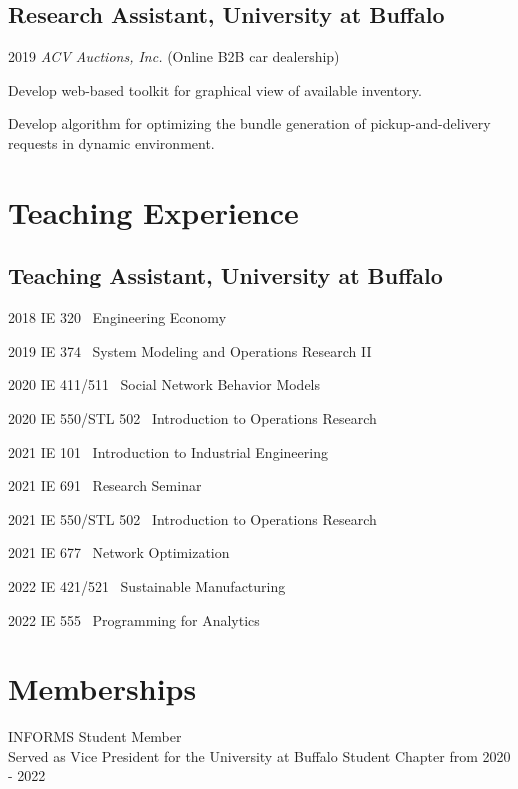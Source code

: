 \documentclass[12pt,letterpaper]{report}
\newcommand{\listitemspace}{0.25em}
\renewenvironment{itemize}
{\begin{list}{}{\setlength{\leftmargin}{0em}
                \setlength{\parskip}{0em}
                \setlength{\itemsep}{\listitemspace}
                \setlength{\parsep}{\listitemspace}}}
{\end{list}}
\begin{document}
    \subsection*{Research Assistant, University at Buffalo}
    \begin{tablist}
        \item[2019] \tab{} \textit{ACV Auctions, Inc.} (Online B2B car dealership)\\
        \item[] \tab{} Develop web-based toolkit for graphical view of available inventory. 
        \item[] \tab{} Develop algorithm for optimizing the bundle generation of pickup-and-delivery requests in dynamic environment.
    \end{tablist}

    \section*{Teaching Experience}
    \subsection*{Teaching Assistant, University at Buffalo}
    \begin{tablist}
        \item[2018] \tab{} IE 320 \ Engineering Economy
        \item[2019] \tab{} IE 374 \ System Modeling and Operations Research II
        \item[2020] \tab{} IE 411/511 \ Social Network Behavior Models
        \item[2020] \tab{} IE 550/STL 502 \ Introduction to Operations Research
        \item[2021] \tab{} IE 101 \ Introduction to Industrial Engineering
        \item[2021] \tab{} IE 691 \ Research Seminar
        \item[2021] \tab{} IE 550/STL 502 \ Introduction to Operations Research
        \item[2021] \tab{} IE 677 \ Network Optimization
        \item[2022] \tab{} IE 421/521 \ Sustainable Manufacturing
        \item[2022] \tab{} IE 555 \ Programming for Analytics
    \end{tablist}

    \section*{Memberships}
    \begin{itemize}
        \item INFORMS Student Member\\
        \quad Served as Vice President for the University at Buffalo Student Chapter from 2020 - 2022
    \end{itemize}
\end{document}
